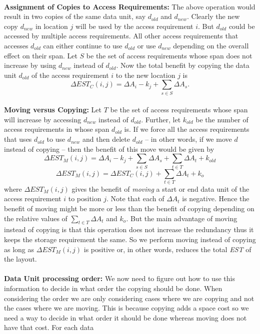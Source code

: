 \\
{\bf Assignment of Copies to Access Requirements:} The above operation would result in two copies of the same data unit, say $d_{old}$ and $d_{new}$. Clearly the new copy $d_{new}$ in location $j$ will be used by the access requirement $i$.  But $d_{old}$ could be accessed by
multiple access requirements. All other access requirements that accesses $d_{old}$ can either continue to use $d_{old}$ or use $d_{new}$ depending on the overall effect on their span. Let $S$ be the set of access requirements whose span does not increase by using $d_{new}$ instead of $d_{old}$. Now the total benefit by copying the data unit $d_{old}$ of the access requirement $i$ to the new location $j$ is
\begin{equation}
\Delta EST_C(i,j) = \Delta A_i - k_j + \sum_{s\in S}\Delta{A_s}.
\label{eq:copyingcost}
\end{equation}
\\
{\bf Moving versus Copying:} Let $T$ be the set of access requirements whose span will increase by accessing $d_{new}$ instead of $d_{old}$. Further, let $k_{old}$ be the number of access requirements in whose span $d_{old}$ is. If we force all the access requirements that uses $d_{old}$ to use $d_{new}$ and then delete $d_{old}$ -- in other words, if we move $d$ instead of copying -- then the benefit of this move would be given by
\[
 \Delta EST_M(i,j) = \Delta A_i - k_j + \sum_{s\in S}\Delta{A_s} + \sum_{t\in T}\Delta{A_t} + k_{old}
\]
\[
 \Delta EST_M(i,j) = \Delta EST_C(i,j) + \sum_{t\in T}\Delta{A_t} + k_o
\]
where $\Delta EST_M(i,j)$ gives the benefit of {\it moving} a start or end data unit of the access requirement $i$ to position $j$. Note that each of $\Delta A_t$ is negative. Hence the benefit of moving might be more or less than the benefit of copying depending on the relative values of $\sum_{t\in T}\Delta{A_t}$ and $k_o$. But the main advantage of moving instead of copying is that this operation does not increase the redundancy thus it keeps the storage requirement the same. So we perform moving instead of copying as long as $\Delta EST_M(i,j)$ is positive or, in other words, reduces the total {\em EST} of the layout.\\
\\
{\bf Data Unit processing order:} 
We now need to figure out how to use this
information to decide in what order the copying should be done. When considering the order we are only considering cases where we are copying and not the cases where we are moving. This is because copying adds a space cost so we need a way to decide in what order it should be done whereas moving does not have that cost. For each data
